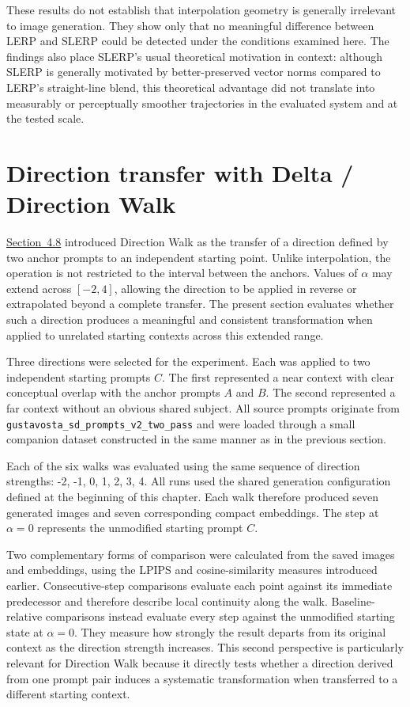 These results do not establish that interpolation geometry is generally irrelevant to image generation. They show only that no meaningful difference between LERP and SLERP could be detected under the conditions examined here. The findings also place SLERP's usual theoretical motivation in context: although SLERP is generally motivated by better-preserved vector norms compared to LERP's straight-line blend, this theoretical advantage did not translate into measurably or perceptually smoother trajectories in the evaluated system and at the tested scale.

\FloatBarrier
\section{Direction transfer with Delta / Direction Walk}\label{sec:5.4}

\hyperref[sec:4.8]{Section~4.8} introduced Direction Walk as the transfer of a direction defined by two anchor prompts to an independent starting point. Unlike interpolation, the operation is not restricted to the interval between the anchors. Values of $\alpha$ may extend across $[-2, 4]$, allowing the direction to be applied in reverse or extrapolated beyond a complete transfer. The present section evaluates whether such a direction produces a meaningful and consistent transformation when applied to unrelated starting contexts across this extended range.

Three directions were selected for the experiment. Each was applied to two independent starting prompts $C$. The first represented a near context with clear conceptual overlap with the anchor prompts $A$ and $B$. The second represented a far context without an obvious shared subject. All source prompts originate from \texttt{gustavosta\_sd\_prompts\_v2\_two\_pass} and were loaded through a small companion dataset constructed in the same manner as in the previous section.

Each of the six walks was evaluated using the same sequence of direction strengths: -2, -1, 0, 1, 2, 3, 4. All runs used the shared generation configuration defined at the beginning of this chapter. Each walk therefore produced seven generated images and seven corresponding compact embeddings. The step at $\alpha=0$ represents the unmodified starting prompt $C$.

Two complementary forms of comparison were calculated from the saved images and embeddings, using the LPIPS and cosine-similarity measures introduced earlier. Consecutive-step comparisons evaluate each point against its immediate predecessor and therefore describe local continuity along the walk. Baseline-relative comparisons instead evaluate every step against the unmodified starting state at $\alpha=0$. They measure how strongly the result departs from its original context as the direction strength increases. This second perspective is particularly relevant for Direction Walk because it directly tests whether a direction derived from one prompt pair induces a systematic transformation when transferred to a different starting context.

